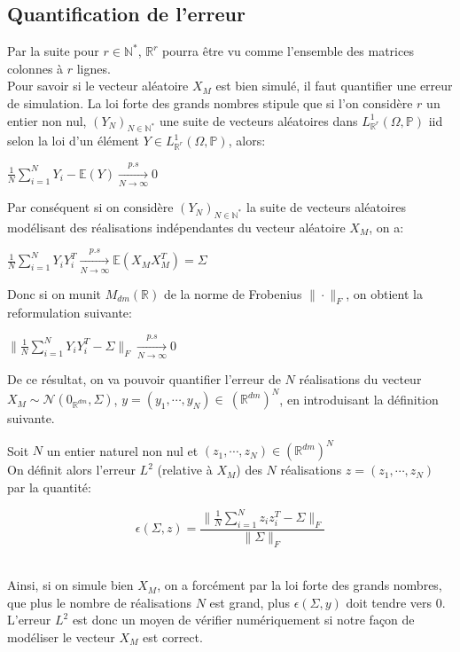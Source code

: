 \subsection{Quantification de l'erreur}
\label{quantifErreur}
Par la suite pour $r \in \mathbb{N}^{*}$, $\mathbb{R}^r$ pourra être vu comme l'ensemble des matrices colonnes à $r$ lignes.\\

Pour savoir si le vecteur aléatoire $X_M$ est bien simulé, il faut quantifier
une erreur de simulation. La loi forte des grands nombres stipule que si l'on considère $r$ un entier non nul, $(Y_N)_{N \in \mathbb{N}^{*}}$
une suite de vecteurs aléatoires dans $L^1_{\mathbb{R}^r}(\Omega,\mathbb{P})$ iid selon la loi d'un élément $Y \in L^1_{\mathbb{R}^r}(\Omega,\mathbb{P})$, alors:
\begin{center} $\frac{1}{N}\displaystyle\sum_{i = 1}^{N} Y_i  - \mathbb{E}(Y) \xrightarrow[N \to \infty]{p.s} 0$ \end{center}

\noindent Par conséquent si on considère $(Y_N)_{N \in \mathbb{N}^{*}}$ la suite de vecteurs aléatoires modélisant des réalisations indépendantes du vecteur aléatoire $X_M$, on a:
\begin{center} $\frac{1}{N}\displaystyle\sum_{i = 1}^{N} Y_iY_{i}^{T} \xrightarrow[N \to \infty]{p.s} \mathbb{E}(X_MX_{M}^{T}) = \Sigma $ \end{center}

\noindent Donc si on munit $M_{dm}(\mathbb{R})$ de la norme de Frobenius $ \|\cdot\|_F $, on obtient la reformulation suivante:
\begin{center} $\biggl \|\frac{1}{N}\displaystyle\sum_{i = 1}^{N} Y_iY_{i}^{T} - \Sigma \biggr\|_F \xrightarrow[N \to \infty]{p.s} 0 $ \end{center}

\noindent De ce résultat, on va pouvoir quantifier l'erreur de $N$ réalisations du vecteur $X_M \sim \mathcal{N}(0_{\mathbb{R}^{dm}},\Sigma) $, $y = (y_1, \cdots, y_N) \in~(\mathbb{R}^{dm})^N$, en introduisant la définition suivante.\\


\begin{definition}
Soit $N$ un entier naturel non nul et  $(z_1, \cdots, z_N) \in (\mathbb{R}^{dm})^N$ 
~\\
On définit alors l'erreur $L^2$ (relative à $X_M$) des $N$ réalisations $z=(z_1, \cdots, z_N)$ par la quantité:

\begin{equation*}
  \epsilon(\Sigma, z) = \frac{\biggl \|\frac{1}{N}\displaystyle\sum_{i = 1}^{N} z_iz_{i}^{T} - \Sigma \biggr \|_F}{\|\Sigma \|_F}
\end{equation*}
\end{definition}
~\\
\newpage
Ainsi, si on simule bien $X_M$, on a forcément par la loi forte des grands nombres, que plus le nombre de réalisations $N$ est grand, plus $\epsilon(\Sigma, y)$ doit tendre vers $0$.
L'erreur $L^2$ est donc un moyen de vérifier numériquement si notre façon de modéliser le vecteur $X_M$ est correct.\\

